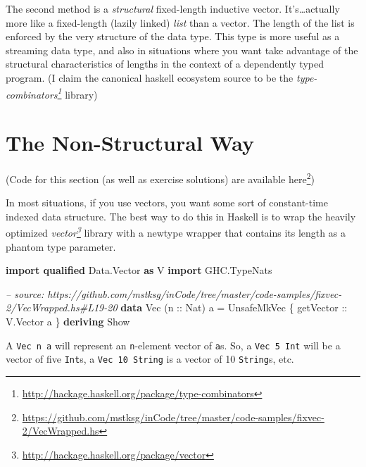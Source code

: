 \documentclass[]{article}
\newenvironment{Shaded}{}{}
\newcommand{\KeywordTok}[1]{\textcolor[rgb]{0.00,0.44,0.13}{\textbf{#1}}}
\newcommand{\DataTypeTok}[1]{\textcolor[rgb]{0.56,0.13,0.00}{#1}}
\newcommand{\CommentTok}[1]{\textcolor[rgb]{0.38,0.63,0.69}{\textit{#1}}}
\newcommand{\OtherTok}[1]{\textcolor[rgb]{0.00,0.44,0.13}{#1}}
\newcommand{\FunctionTok}[1]{\textcolor[rgb]{0.02,0.16,0.49}{#1}}
\newcommand{\NormalTok}[1]{#1}
\renewcommand{\href}[2]{#2\footnote{\url{#1}}}
\begin{document}
The second method is a \emph{structural} fixed-length inductive vector.
It's\ldots{}actually more like a fixed-length (lazily linked) \emph{list} than a
vector. The length of the list is enforced by the very structure of the data
type. This type is more useful as a streaming data type, and also in situations
where you want take advantage of the structural characteristics of lengths in
the context of a dependently typed program. (I claim the canonical haskell
ecosystem source to be the
\emph{\href{http://hackage.haskell.org/package/type-combinators}{type-combinators}}
library)

\section{The Non-Structural Way}\label{the-non-structural-way}

(Code for this section (as well as exercise solutions) are
\href{https://github.com/mstksg/inCode/tree/master/code-samples/fixvec-2/VecWrapped.hs}{available
here})

In most situations, if you use vectors, you want some sort of constant-time
indexed data structure. The best way to do this in Haskell is to wrap the
heavily optimized
\emph{\href{http://hackage.haskell.org/package/vector}{vector}} library with a
newtype wrapper that contains its length as a phantom type parameter.

\begin{Shaded}
\begin{Highlighting}[]
\KeywordTok{import qualified} \DataTypeTok{Data.Vector} \KeywordTok{as} \DataTypeTok{V}
\KeywordTok{import           }\DataTypeTok{GHC.TypeNats}

\CommentTok{-- source: https://github.com/mstksg/inCode/tree/master/code-samples/fixvec-2/VecWrapped.hs#L19-20}
\KeywordTok{data} \DataTypeTok{Vec}\NormalTok{ (}\OtherTok{n ::} \DataTypeTok{Nat}\NormalTok{) a }\FunctionTok{=} \DataTypeTok{UnsafeMkVec}\NormalTok{ \{}\OtherTok{ getVector ::} \DataTypeTok{V.Vector}\NormalTok{ a \}}
    \KeywordTok{deriving} \DataTypeTok{Show}
\end{Highlighting}
\end{Shaded}

A \texttt{Vec\ n\ a} will represent an \texttt{n}-element vector of \texttt{a}s.
So, a \texttt{Vec\ 5\ Int} will be a vector of five \texttt{Int}s, a
\texttt{Vec\ 10\ String} is a vector of 10 \texttt{String}s, etc.
\end{document}
